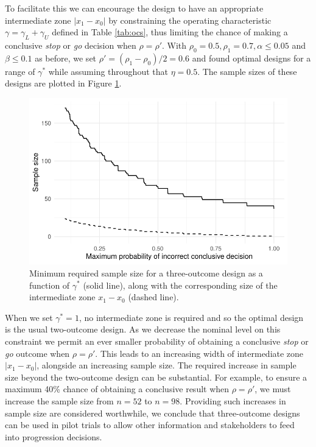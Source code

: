 \documentclass{bmcart}
\begin{document}
To facilitate this we can encourage the design to have an appropriate intermediate zone $| x_1 - x_0|$ by constraining the operating characteristic $\gamma = \gamma_L + \gamma_U$ defined in Table \ref{tab:ocs}, thus limiting the chance of making a conclusive \emph{stop} or \emph{go} decision when $\rho = \rho'$. With $\rho_0 = 0.5, \rho_1 = 0.7, \alpha \leq 0.05$ and $\beta \leq 0.1$ as before, we set $\rho' = (\rho_1 - \rho_0)/2 = 0.6$ and found optimal designs for a range of $\gamma^*$ while assuming throughout that $\eta = 0.5$. The sample sizes of these designs are plotted in Figure \ref{fig:gamma_ns}.

\begin{figure}
\centering
\includegraphics[scale=0.8]{./figures/gamma_ns}
\caption{Minimum required sample size for a three-outcome design as a function of $\gamma^*$ (solid line), along with the corresponding size of the intermediate zone $x_1 - x_0$ (dashed line).}
\label{fig:gamma_ns}
\end{figure}

When we set $\gamma^* = 1$, no intermediate zone is required and so the optimal design is the usual two-outcome design. As we decrease the nominal level on this constraint we permit an ever smaller probability of obtaining a conclusive \emph{stop} or \emph{go} outcome when $\rho = \rho'$. This leads to an increasing width of intermediate zone $|x_1 - x_0|$, alongside an increasing sample size. The required increase in sample size beyond the two-outcome design can be substantial. For example, to ensure a maximum 40\% chance of obtaining a conclusive result when $\rho = \rho'$, we must increase the sample size from $n = 52$ to $n = 98$. Providing such increases in sample size are considered worthwhile, we conclude that three-outcome designs can be used in pilot trials to allow other information and stakeholders to feed into progression decisions.
\end{document}
